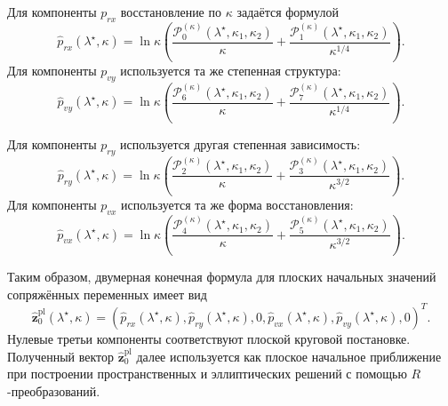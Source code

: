 Для компоненты \(p_{rx}\) восстановление по \(\kappa\) задаётся формулой
\begin{equation}
	\widehat p_{rx}(\lambda^\star,\kappa)
	=
	\ln\kappa
	\left(
	\frac{\mathcal P_{0}^{(\kappa)}(\lambda^\star,\kappa_1,\kappa_2)}{\kappa}
	+
	\frac{\mathcal P_{1}^{(\kappa)}(\lambda^\star,\kappa_1,\kappa_2)}{\kappa^{1/4}}
	\right).
	\label{eq:chap2_kappa_reconstruction_prx}
\end{equation}
Для компоненты \(p_{vy}\) используется та же степенная структура:
\begin{equation}
	\widehat p_{vy}(\lambda^\star,\kappa)
	=
	\ln\kappa
	\left(
	\frac{\mathcal P_{6}^{(\kappa)}(\lambda^\star,\kappa_1,\kappa_2)}{\kappa}
	+
	\frac{\mathcal P_{7}^{(\kappa)}(\lambda^\star,\kappa_1,\kappa_2)}{\kappa^{1/4}}
	\right).
	\label{eq:chap2_kappa_reconstruction_pvy}
\end{equation}

Для компоненты \(p_{ry}\) используется другая степенная зависимость:
\begin{equation}
	\widehat p_{ry}(\lambda^\star,\kappa)
	=
	\ln\kappa
	\left(
	\frac{\mathcal P_{2}^{(\kappa)}(\lambda^\star,\kappa_1,\kappa_2)}{\kappa}
	+
	\frac{\mathcal P_{3}^{(\kappa)}(\lambda^\star,\kappa_1,\kappa_2)}{\kappa^{3/2}}
	\right).
	\label{eq:chap2_kappa_reconstruction_pry}
\end{equation}
Для компоненты \(p_{vx}\) используется та же форма восстановления:
\begin{equation}
	\widehat p_{vx}(\lambda^\star,\kappa)
	=
	\ln\kappa
	\left(
	\frac{\mathcal P_{4}^{(\kappa)}(\lambda^\star,\kappa_1,\kappa_2)}{\kappa}
	+
	\frac{\mathcal P_{5}^{(\kappa)}(\lambda^\star,\kappa_1,\kappa_2)}{\kappa^{3/2}}
	\right).
	\label{eq:chap2_kappa_reconstruction_pvx}
\end{equation}

Таким образом, двумерная конечная формула для плоских начальных значений
сопряжённых переменных имеет вид
\begin{equation}
	\widehat{\mathbf z}^{\mathrm{pl}}_0(\lambda^\star,\kappa)
	=
	\left(
	\widehat p_{rx}(\lambda^\star,\kappa),
	\widehat p_{ry}(\lambda^\star,\kappa),
	0,
	\widehat p_{vx}(\lambda^\star,\kappa),
	\widehat p_{vy}(\lambda^\star,\kappa),
	0
	\right)^T.
	\label{eq:chap2_planar_adjoint_vector_main}
\end{equation}
Нулевые третьи компоненты соответствуют плоской круговой постановке. Полученный вектор \(\widehat{\mathbf z}^{\mathrm{pl}}_0\) далее используется как плоское начальное приближение при построении пространственных и эллиптических решений с помощью \(R\)-преобразований.

